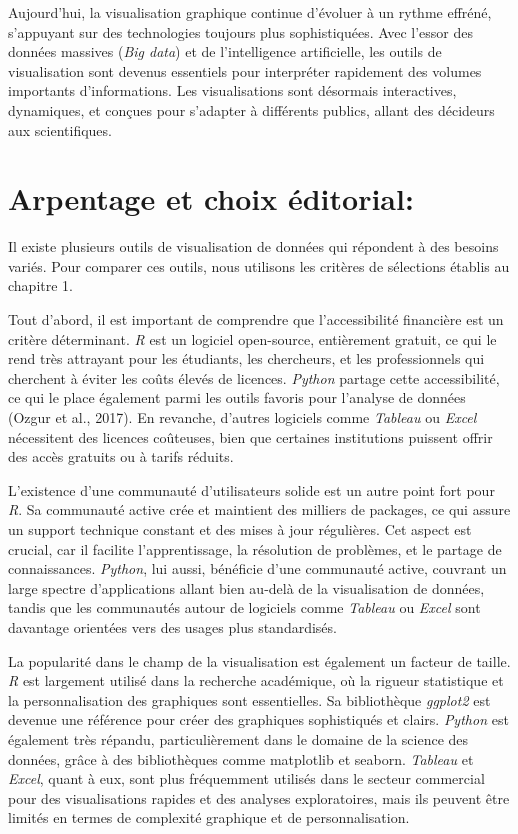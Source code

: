 \documentclass[
  letterpaper,
  DIV=11,
  numbers=noendperiod]{scrreprt}
\begin{document}
Aujourd'hui, la visualisation graphique continue d'évoluer à un rythme
effréné, s'appuyant sur des technologies toujours plus sophistiquées.
Avec l'essor des données massives (\emph{Big data}) et de l'intelligence
artificielle, les outils de visualisation sont devenus essentiels pour
interpréter rapidement des volumes importants d'informations. Les
visualisations sont désormais interactives, dynamiques, et conçues pour
s'adapter à différents publics, allant des décideurs aux scientifiques.

\section{Arpentage et choix
éditorial:}\label{arpentage-et-choix-uxe9ditorial}

Il existe plusieurs outils de visualisation de données qui répondent à
des besoins variés. Pour comparer ces outils, nous utilisons les
critères de sélections établis au chapitre 1.

Tout d'abord, il est important de comprendre que l'accessibilité
financière est un critère déterminant. \emph{R} est un logiciel
open-source, entièrement gratuit, ce qui le rend très attrayant pour les
étudiants, les chercheurs, et les professionnels qui cherchent à éviter
les coûts élevés de licences. \emph{Python} partage cette accessibilité,
ce qui le place également parmi les outils favoris pour l'analyse de
données (Ozgur et al., 2017). En revanche, d'autres logiciels comme
\emph{Tableau} ou \emph{Excel} nécessitent des licences coûteuses, bien
que certaines institutions puissent offrir des accès gratuits ou à
tarifs réduits.

L'existence d'une communauté d'utilisateurs solide est un autre point
fort pour \emph{R}. Sa communauté active crée et maintient des milliers
de packages, ce qui assure un support technique constant et des mises à
jour régulières. Cet aspect est crucial, car il facilite
l'apprentissage, la résolution de problèmes, et le partage de
connaissances. \emph{Python}, lui aussi, bénéficie d'une communauté
active, couvrant un large spectre d'applications allant bien au-delà de
la visualisation de données, tandis que les communautés autour de
logiciels comme \emph{Tableau} ou \emph{Excel} sont davantage orientées
vers des usages plus standardisés.

La popularité dans le champ de la visualisation est également un facteur
de taille. \emph{R} est largement utilisé dans la recherche académique,
où la rigueur statistique et la personnalisation des graphiques sont
essentielles. Sa bibliothèque \emph{ggplot2} est devenue une référence
pour créer des graphiques sophistiqués et clairs. \emph{Python} est
également très répandu, particulièrement dans le domaine de la science
des données, grâce à des bibliothèques comme matplotlib et seaborn.
\emph{Tableau} et \emph{Excel}, quant à eux, sont plus fréquemment
utilisés dans le secteur commercial pour des visualisations rapides et
des analyses exploratoires, mais ils peuvent être limités en termes de
complexité graphique et de personnalisation.
\end{document}
